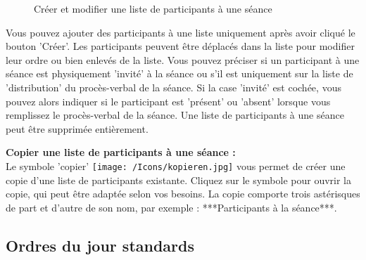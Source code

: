 \begin{figure}[H]
\end{figure}

\begin{figure}[H]
\vspace{-25pt}
\caption{Créer et modifier une liste de participants à une séance}
\end{figure}

Vous pouvez ajouter des participants à une liste uniquement après avoir cliqué le bouton 'Créer'. Les participants peuvent être déplacés dans la liste pour modifier leur ordre ou bien enlevés de la liste. Vous pouvez préciser si un participant à une séance est physiquement 'invité' à la séance ou s'il est uniquement sur la liste de 'distribution' du procès-verbal de la séance. Si la case 'invité' est cochée, vous pouvez alors indiquer si le participant est 'présent' ou 'absent' lorsque vous remplissez le procès-verbal de la séance. Une liste de participants à une séance peut être supprimée entièrement.

\vspace{\baselineskip}

\textbf{Copier une liste de participants à une séance :}\\
Le symbole 'copier' \texttt{[image: /Icons/kopieren.jpg]} vous permet de créer une copie d'une liste de participants existante. Cliquez sur le symbole pour ouvrir la copie, qui peut être adaptée selon vos besoins. La copie comporte trois astérisques de part et d'autre de son nom, par exemple : ***Participants à la séance***.

\clearpage
\subsection{Ordres du jour standards}

